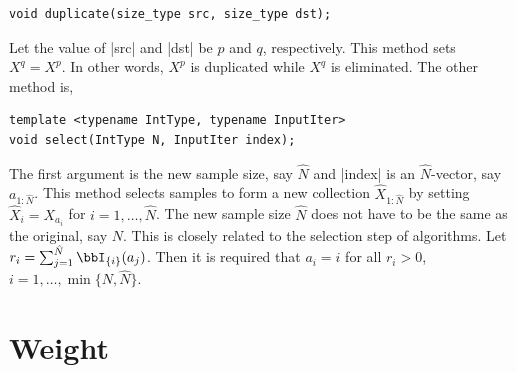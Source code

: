 \begin{Verbatim}
void duplicate(size_type src, size_type dst);
\end{Verbatim}
Let the value of |src| and |dst| be $p$ and $q$, respectively. This method sets
$X^q = X^p$. In other words, $X^p$ is duplicated while $X^q$ is eliminated. The
other method is,
\begin{Verbatim}
template <typename IntType, typename InputIter>
void select(IntType N, InputIter index);
\end{Verbatim}
The first argument is the new sample size, say $\hat{N}$ and |index| is an
$\hat{N}$-vector, say $a_{1:\hat{N}}$. This method selects samples to form a
new collection $\hat{X}_{1:\hat{N}}$  by setting $\hat{X}_i = X_{a_i}$ for $i =
1,\dots,\hat{N}$. The new sample size $\hat{N}$ does not have to be the same as
the original, say $N$. This is closely related to the selection step of \smc
algorithms. Let $r_i = \sum_{j = 1}^{\hat{N}}\bbI_{\{i\}}(a_j)$. Then it is
required that $a_i = i$ for all $r_i > 0$, $i = 1,\dots,\min\{N, \hat{N}\}$.

\section{Weight}
\label{sec:Weight}

